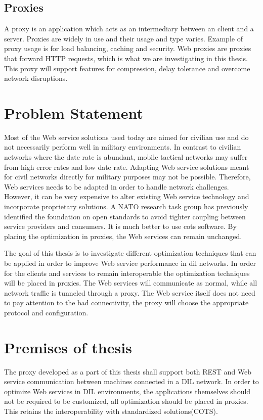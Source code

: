 \subsection{Proxies}

A proxy is an application which acts as an intermediary between an client and a
server. Proxies are widely in use and their usage and type varies. Example of
proxy usage is for load balancing, caching and security. Web proxies are proxies
that forward HTTP requests, which is what we are investigating in this thesis.
This proxy will support features for compression, delay tolerance and overcome
network disruptions.


\section{Problem Statement}
Most of the Web service solutions used today are aimed for civilian use and do
not necessarily perform well in military environments. In contrast to civilian
networks where the date rate is abundant, mobile tactical networks may suffer
from high error rates and low date rate. Adapting Web service solutions meant
for civil networks directly for military purposes may not be possible.
Therefore, Web services needs to be adapted in order to handle network
challenges. However, it can be very expensive to alter existing Web service
technology and incorporate proprietary solutions. A NATO research task group has
previously identified the foundation on open standards to avoid tighter coupling
between service providers and consumers\cite{ist-090}. It is much better to use
\gls{cots} software. By placing the optimization in proxies, the
Web services can remain unchanged.

The goal of this thesis is to investigate different optimization techniques that
can be applied in order to improve Web service performance in \gls{dil}
networks. In order for the clients and services to remain interoperable the
optimization techniques will be placed in proxies. The Web services will
communicate as normal, while all network traffic is tunneled through a proxy.
The Web service itself does not need to pay attention to the bad connectivity,
the proxy will choose the appropriate protocol and configuration.

\section{Premises of thesis}

The proxy developed as a part of this thesis shall support both REST and Web
service communication between machines connected in a DIL network. In order to
optimize Web services in DIL environments, the applications themselves should
not be required to be customized, all optimization should be placed in proxies.
This retains the interoperability with standardized solutions(COTS).

